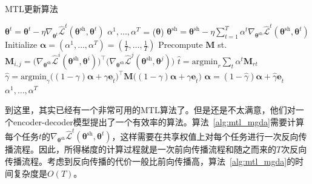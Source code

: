 \documentclass{ctexart}
\begin{document}
\begin{algorithm}[H]
\caption{MTL更新算法}
\label{alg:mtl_mgda}
\begin{algorithmic}[1]
\State $\bm\theta^t = \bm\theta^t - \eta \nabla_{\bm\theta^{t}}  \hat{\mathcal{L}}^t(\bm\theta^\mathrm{sh},\bm\theta^t)$  
\EndFor
\State $\alpha^1,\ldots,\alpha^{T}$ = ($\bm\theta$) 
\State $\bm\theta^\mathrm{sh} = \bm\theta^\mathrm{sh} -   \eta \sum_{t=1}^T \alpha^t \nabla_{\bm\theta^\mathrm{sh}}  \hat{\mathcal{L}}^t(\bm\theta^\mathrm{sh},\bm\theta^t)$ 
\Statex
{}
\State Initialize $\bm{\alpha} = (\alpha^1, \ldots, \alpha^{T}) = (\frac{1}{T}, \ldots, \frac{1}{T})$
\State Precompute $\mathbf{M}$ st. $\mathbf{M}_{i,j} = \big(\nabla_{\bm\theta^\mathrm{sh}}  \hat{\mathcal{L}}^i(\bm\theta^\mathrm{sh},\bm\theta^i)\big)^\intercal \big(\nabla_{\bm\theta^\mathrm{sh}}  \hat{\mathcal{L}}^j(\bm\theta^\mathrm{sh},\bm\theta^j)\big)$
\Repeat
\State $\hat{t} = \mathrm{argmin}_r \sum_t \alpha^t \mathbf{M}_{rt}$
\State $\hat{\gamma} = \mathrm{argmin}_{\gamma}  \big( (1 - \gamma) \bm{\alpha} + \gamma \bm{e}_{\hat{t}}  \big)^\intercal \mathbf{M}  \big( (1 - \gamma) \bm{\alpha} + \gamma \bm{e}_{\hat{t}}  \big)$ 
\State $\bm{\alpha} = (1- \hat{\gamma})\bm{\alpha} + \hat{\gamma} \bm{e}_{\hat{t}}$
 $\alpha^1,\ldots,\alpha^{T}$
\EndProcedure
\end{algorithmic}
\end{algorithm}

到这里，其实已经有一个非常可用的MTL算法了。但是\citet{Sener18Pareto}还是不太满意，他们对一个encoder-decoder模型提出了一个有效率的算法。算法~\ref{alg:mtl_mgda}需要计算每个任务$t$的$\nabla_{\bm\theta^\mathrm{sh}}  \hat{\mathcal{L}}^t(\bm\theta^\mathrm{sh},\bm\theta^t)$，这样需要在共享权值上对每个任务进行一次反向传播流程。因此，所得梯度的计算过程就是一次前向传播流程和随之而来的$T$次反向传播流程。考虑到反向传播的代价一般比前向传播高，算法~\ref{alg:mtl_mgda}的时间复杂度是$O(T)$。
\end{document}
